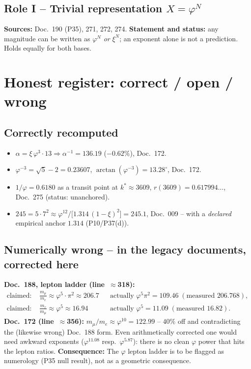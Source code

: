 \subsection{Role I -- Trivial representation $X=\varphi^N$}
\textbf{Sources:} Doc.~190 (P35), 271, 272, 274. \textbf{Statement and
status:} any magnitude can be written as $\varphi^N$ \emph{or} $\xi^N$; an
exponent alone is not a prediction. Holds equally for both bases.

\section{Honest register: correct / open / wrong}\label{sec:fehler}

\subsection{Correctly recomputed}
\begin{itemize}
  \item $\alpha = \xi\,\varphi^3\cdot13 \Rightarrow \alpha^{-1}=136.19$
        ($-0.62\%$), Doc.~172.
  \item $\varphi^{-3}=\sqrt5-2=0.23607$, $\arctan(\varphi^{-3})=13.28^\circ$,
        Doc.~172.
  \item $1/\varphi=0.6180$ as a transit point at $k^*\approx3609$,
        $r(3609)=0.617994\ldots$, Doc.~275 (status: unanchored).
  \item $245 = 5\cdot7^2 \approx \varphi^{12}/\bigl[1.314\,(1-\xi)^2\bigr] = 245.1$, Doc.~009 --
        with a \emph{declared} empirical anchor $1.314$ (P10/P37(d)).
\end{itemize}

\subsection{Numerically wrong -- in the legacy documents, corrected here}
\begin{critical}
\textbf{Doc.~188, lepton ladder (line~$\approx$318):}
\begin{align}
  \text{claimed: } & \frac{m_\mu}{m_e}\approx\varphi^5\cdot\pi^2\approx 206.7
    && \text{actually } \varphi^5\pi^2 = 109.46 \;(\text{measured }206.768),\\
  \text{claimed: } & \frac{m_\tau}{m_\mu}\approx\varphi^5\approx 16.94
    && \text{actually } \varphi^5 = 11.09 \;(\text{measured }16.82).
\end{align}
\textbf{Doc.~172 (line~$\approx$356):} $m_\mu/m_e\approx\varphi^{10}=122.99$ --
$40\%$ off and contradicting the (likewise wrong) Doc.~188 form. Even
arithmetically corrected one would need awkward exponents
($\varphi^{11.08}$ resp.\ $\varphi^{5.87}$): there is no clean
$\varphi$ power that hits the lepton ratios.
\textbf{Consequence:} The $\varphi$ lepton ladder is to be flagged as
numerology (P35 null result), not as a geometric consequence.
\end{critical}

